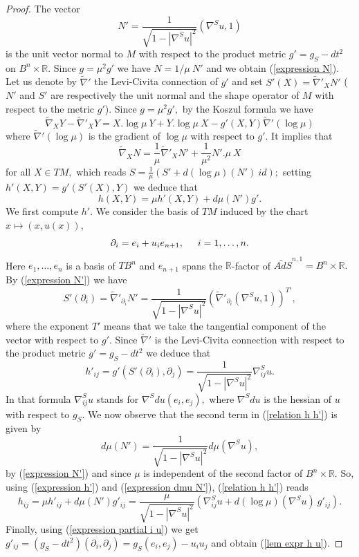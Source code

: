 \documentclass[10pt,reqno,oneside]{amsart}
\theoremstyle{definition}
\theoremstyle{remark}
\newcommand{\R}{\mathbb{R}}
\begin{document}
\begin{proof}
The vector
\begin{equation}\label{expression N'}
N'=\frac{1}{\sqrt{1-|\nabla^S u|^2}}(\nabla^S u, 1)
\end{equation}
is the unit vector normal to $M$ with respect to the product metric $g'=g_S-dt^2$ on $B^n\times\R$. Since $g=\mu^2 g'$ we have $N=1/\mu\ N'$ and we obtain (\ref{expression N}). Let us denote by $\widetilde{\nabla}'$ the Levi-Civita connection of $g'$ and set $S'(X)=\widetilde{\nabla}'_XN'$ ($N'$ and $S'$ are respectively the unit normal and the shape operator of $M$ with respect to the metric $g'$). Since $g=\mu^2 g',$ by the Koszul formula we have
$$\widetilde{\nabla}_XY-\widetilde{\nabla}'_XY=X.\log\mu\ Y+Y.\log\mu\ X-g'(X,Y)\widetilde{\nabla}'(\log\mu)$$
where $\widetilde{\nabla}'(\log\mu)$ is the gradient of $\log\mu$ with respect to $g'.$ It implies that
$$\widetilde{\nabla}_XN=\frac{1}{\mu}\widetilde{\nabla}'_XN'+\frac{1}{\mu^2}N'.\mu\ X$$
for all $X\in TM,$ which reads $S=\frac{1}{\mu}\left(S'+d(\log\mu)(N')\ id\right);$ setting $h'(X,Y)=g'(S'(X),Y)$ we deduce that
\begin{equation}\label{relation h h'}
h(X,Y)=\mu h'(X,Y)+d\mu(N')g'.
\end{equation}
We first compute $h'.$ We consider the basis of $TM$ induced by the chart $x\mapsto (x,u(x))$, 
\begin{equation}\label{expression partial i u}
\partial_i=e_i+u_i e_{n+1},\hspace{.5cm}i=1,\ldots,n.
\end{equation}
Here $e_1,\ldots,e_n$ is a basis of $TB^n$ and $e_{n+1}$ spans the $\R$-factor of $\widetilde{AdS}^{n,1}=B^n\times\R.$ By (\ref{expression N'}) we have
$$S'(\partial_i)=\widetilde{\nabla}'_{\partial_i}N'=\frac{1}{\sqrt{1-|\nabla^S u|^2}}\left(\widetilde{\nabla}'_{\partial_i}(\nabla^S u,1)\right)^{T'},$$
where the exponent $T'$ means that we take the tangential component of the vector with respect to $g'.$ Since $\widetilde{\nabla}'$ is the Levi-Civita connection with respect to the product metric $g'=g_S-dt^2$ we deduce that 
\begin{equation}\label{expression h'}
h'_{ij}=g'(S'(\partial_i),\partial_j)=\frac{1}{\sqrt{1-|\nabla^S u|^2}}\nabla^S_{ij}u.
\end{equation}
In that formula $\nabla^S_{ij}u$ stands for $\nabla^Sdu(e_i,e_j),$ where $\nabla^Sdu$ is the hessian of $u$ with respect to $g_S.$ We now observe that the second term in (\ref{relation h h'}) is given by
\begin{equation}\label{expression dmu N'}
d\mu(N')=\frac{1}{\sqrt{1-|\nabla^S u|^2}}d\mu(\nabla^S u),
\end{equation}
by (\ref{expression N'}) and since $\mu$ is independent of the second factor of $B^n\times\R$. So, using (\ref{expression h'}) and (\ref{expression dmu N'}), (\ref{relation h h'}) reads
$$h_{ij}=\mu h'_{ij}+d\mu(N')g'_{ij}=\frac{\mu}{\sqrt{1-|\nabla^S u|^2}}\left(\nabla^S_{ij}u+d(\log\mu)(\nabla^S u)\ g'_{ij}\right).$$
Finally, using (\ref{expression partial i u}) we get $g'_{ij}=(g_S-dt^2)(\partial_i,\partial_j)=g_{S}(e_i,e_j)-u_iu_j$ and obtain (\ref{lem expr h u}).
\end{proof}
\end{document}
